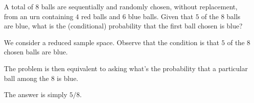 \Example{}\label{a85c9ad}

A total of $8$ balls are sequentially and randomly chosen, without replacement,
from an urn containing $4$ red balls and $6$ blue balls. Given that $5$ of the
$8$ balls are blue, what is the (conditional) probability that the first ball
chosen is blue?

\begin{solution}
  We consider a reduced sample space. Observe that the condition is that $5$ of
  the $8$ chosen balls are blue.

  The problem is then equivalent to asking what's the probability that a
  particular ball among the $8$ is blue.

  The answer is simply $5/8$.
\end{solution}
